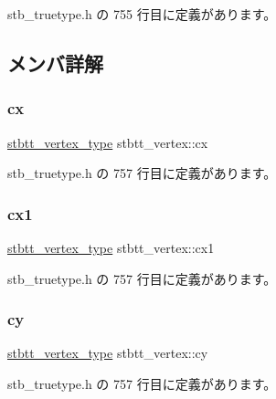  stb\+\_\+truetype.\+h の 755 行目に定義があります。



\subsection{メンバ詳解}
\mbox{\label{structstbtt__vertex_a43835489e2a151b31cb100d20f8adeae}} 
\subsubsection{\texorpdfstring{cx}{cx}}
{\footnotesize\ttfamily \mbox{\hyperlink{stb__truetype_8h_ab8fd8e5e0b82b0f7da54532035e47b22}{stbtt\+\_\+vertex\+\_\+type}} stbtt\+\_\+vertex\+::cx}



 stb\+\_\+truetype.\+h の 757 行目に定義があります。

\mbox{\label{structstbtt__vertex_a1c45a8d41727b24b84f97a944f2b800a}} 
\subsubsection{\texorpdfstring{cx1}{cx1}}
{\footnotesize\ttfamily \mbox{\hyperlink{stb__truetype_8h_ab8fd8e5e0b82b0f7da54532035e47b22}{stbtt\+\_\+vertex\+\_\+type}} stbtt\+\_\+vertex\+::cx1}



 stb\+\_\+truetype.\+h の 757 行目に定義があります。

\mbox{\label{structstbtt__vertex_a5610d6335aa6962d970fc7fd2225545e}} 
\subsubsection{\texorpdfstring{cy}{cy}}
{\footnotesize\ttfamily \mbox{\hyperlink{stb__truetype_8h_ab8fd8e5e0b82b0f7da54532035e47b22}{stbtt\+\_\+vertex\+\_\+type}} stbtt\+\_\+vertex\+::cy}



 stb\+\_\+truetype.\+h の 757 行目に定義があります。

